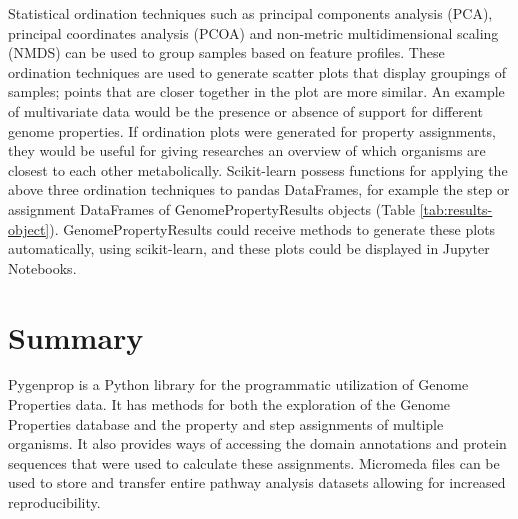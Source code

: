Statistical ordination techniques such as principal components analysis (PCA), principal coordinates analysis (PCOA) and non-metric multidimensional scaling (NMDS) can be used to group samples based on feature profiles. These ordination techniques are used to generate scatter plots that display groupings of samples; points that are closer together in the plot are more similar. An example of multivariate data would be the presence or absence of support for different genome properties. If ordination plots were generated for property assignments, they would be useful for giving researches an overview of which organisms are closest to each other metabolically. Scikit-learn \cite{pedregosa2011scikit} possess functions for applying the above three ordination techniques to pandas DataFrames, for example the step or assignment DataFrames of GenomePropertyResults objects (Table \ref{tab:results-object}). GenomePropertyResults could receive methods to generate these plots automatically, using scikit-learn, and these plots could be displayed in Jupyter Notebooks.

\section{Summary}

Pygenprop is a Python library for the programmatic utilization of Genome Properties data. It has methods for both the exploration of the Genome Properties database and the property and step assignments of multiple organisms. It also provides ways of accessing the domain annotations and protein sequences that were used to calculate these assignments. Micromeda files can be used to store and transfer entire pathway analysis datasets allowing for increased reproducibility.

